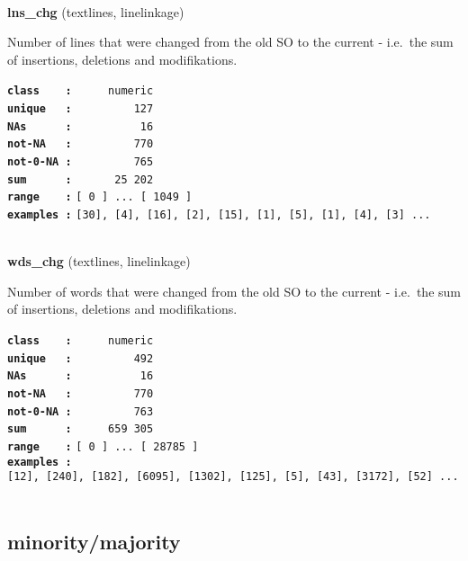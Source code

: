 \documentclass[]{article}
\begin{document}
~

\textbf{lns\_chg} (textlines, linelinkage)

Number of lines that were changed from the old SO to the current -
i.e.~the sum of insertions, deletions and modifikations.

\textbf{\texttt{class\ \ \ \ :}} \texttt{~~~~~numeric}\\
\textbf{\texttt{unique\ \ \ :}} \texttt{~~~~~~~~~127}\\
\textbf{\texttt{NAs\ \ \ \ \ \ :}} \texttt{~~~~~~~~~~16}\\
\textbf{\texttt{not-NA\ \ \ :}} \texttt{~~~~~~~~~770}\\
\textbf{\texttt{not-0-NA\ :}} \texttt{~~~~~~~~~765}\\
\textbf{\texttt{sum\ \ \ \ \ \ :}} \texttt{~~~~~~25~202}\\
\textbf{\texttt{range\ \ \ \ :}}
\texttt{{[}\ 0\ {]}\ ...\ {[}\ 1049\ {]}}\\
\textbf{\texttt{examples\ :}}
\texttt{{[}30{]},\ {[}4{]},\ {[}16{]},\ {[}2{]},\ {[}15{]},\ {[}1{]},\ {[}5{]},\ {[}1{]},\ {[}4{]},\ {[}3{]}\ ...}\\

~

\textbf{wds\_chg} (textlines, linelinkage)

Number of words that were changed from the old SO to the current -
i.e.~the sum of insertions, deletions and modifikations.

\textbf{\texttt{class\ \ \ \ :}} \texttt{~~~~~numeric}\\
\textbf{\texttt{unique\ \ \ :}} \texttt{~~~~~~~~~492}\\
\textbf{\texttt{NAs\ \ \ \ \ \ :}} \texttt{~~~~~~~~~~16}\\
\textbf{\texttt{not-NA\ \ \ :}} \texttt{~~~~~~~~~770}\\
\textbf{\texttt{not-0-NA\ :}} \texttt{~~~~~~~~~763}\\
\textbf{\texttt{sum\ \ \ \ \ \ :}} \texttt{~~~~~659~305}\\
\textbf{\texttt{range\ \ \ \ :}}
\texttt{{[}\ 0\ {]}\ ...\ {[}\ 28785\ {]}}\\
\textbf{\texttt{examples\ :}}
\texttt{{[}12{]},\ {[}240{]},\ {[}182{]},\ {[}6095{]},\ {[}1302{]},\ {[}125{]},\ {[}5{]},\ {[}43{]},\ {[}3172{]},\ {[}52{]}\ ...}\\

~

\subsection{minority/majority}\label{minoritymajority}
\end{document}

